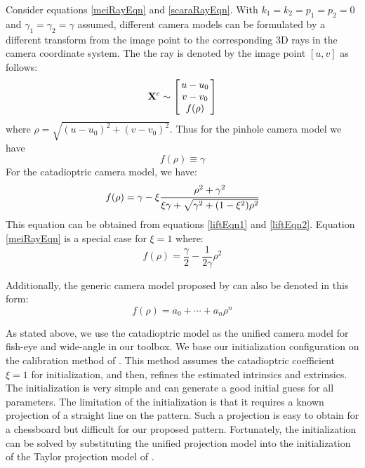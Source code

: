\documentclass{report}
\begin{document}
Consider equations \ref{meiRayEqn} and \ref{scaraRayEqn}. With $k_1 = k_2 = p_1 = p_2 = 0$ and $\gamma_1 = \gamma_2 = \gamma$ assumed, different camera models can be formulated by a different transform from the image point to the corresponding 3D rays in the camera coordinate system. The the ray is denoted by the image point $[u, v]$ as follows: 
\begin{equation}
\mathbf{X}^c \sim 
\arraycolsep=1.5pt%
\begin{bmatrix}
	\begin{array}{c}
	u - u_0 \\ v - v_0 \\ f(\rho)
	\end{array}
\end{bmatrix}
\label{unifiedRayEqn}
\end{equation}
where $\rho = \sqrt{(u - u_0)^2 + (v - v_0)^2}$. Thus for the pinhole camera model we have
\begin{equation}
f(\rho) \equiv \gamma
\end{equation}
For the catadioptric camera model, we have: 
\begin{equation}
f(\rho) = \gamma - \xi \cfrac{\rho^2 + \gamma^2}{\xi \gamma + \sqrt{\gamma^2 + (1 - \xi^2)\rho^2}}
\label{cataEqn}
\end{equation}
This equation can be obtained from equations \ref{liftEqn1} and \ref{liftEqn2}. Equation \ref{meiRayEqn} is a special case for $\xi = 1$ where: 
\begin{equation}
f(\rho) = \frac{\gamma}{2} - \frac{1}{2 \gamma} \rho^2
\label{parabolaEqn}
\end{equation}

Additionally, the generic camera model proposed by \cite{scaramuzza2006toolbox} can also be denoted in this form: 
\begin{equation}
f(\rho) = a_0 + \cdots + a_n \rho^n
\label{polynEqn}
\end{equation}

As stated above, we use the catadioptric model as the unified camera model for fish-eye and wide-angle in our toolbox. We base our initialization configuration on the calibration method of \cite{mei2007single}. This method assumes the catadioptric coefficient $\xi = 1$ for initialization, and then, refines the estimated intrinsics and extrinsics. The initialization is very simple and can generate a good initial guess for all parameters. The limitation of the initialization is that it requires a known projection of a straight line on the pattern. Such a projection is easy to obtain for a chessboard but difficult for our proposed pattern. Fortunately, the initialization can be solved by substituting the unified projection model into the initialization of the Taylor projection model of \cite{scaramuzza2006toolbox}.
\end{document}
